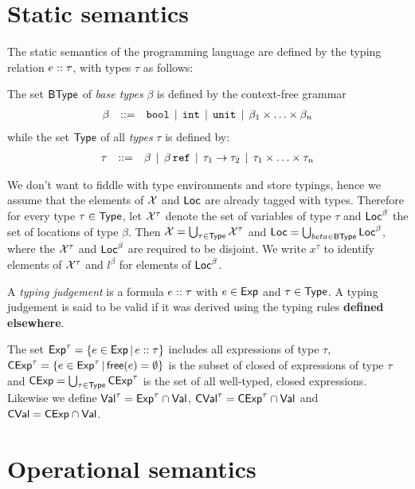 \documentclass[12pt,a4paper]{report}
\newcommand{\CExp}{\sstyle{CExp}}
\newcommand{\CVal}{\sstyle{CVal}}
\newcommand{\BType}{\sstyle{BType}}
\begin{document}

\section{Static semantics}

The static semantics of the programming language are defined by the typing relation
${e}\mathrel{::}{\tau}$, with types $\tau$ as follows:

\begin{definition}[Types]
  The set $\BType$ of {\em base types} $\beta$ is defined by the context-free grammar
  \[\begin{array}{rrlll}
  \beta & ::= & \mathtt{bool} \,\mid\, \mathtt{int} \,\mid\, \mathtt{unit} \,\mid\, \beta_1 \times \ldots \times \beta_n
  \end{array}\]
  while the set $\mathsf{Type}$ of all {\em types} $\tau$ is defined by:
  \[\begin{array}{rrlll}
  \tau & ::= & \beta \,\mid\, \beta\,\mathtt{ref} \,\mid\, \tau_1\to\tau_2 \,\mid\, \tau_1 \times \ldots \times \tau_n
  \end{array}\]
\end{definition}

We don't want to fiddle with type environments and store typings, hence we assume that
the elements of $\mathcal{X}$ and $\mathsf{Loc}$ are already tagged with types. Therefore for every
type $\tau\in\mathsf{Type}$, let $\mathcal{X}^\tau$ denote the set of variables of type $\tau$ and $\mathsf{Loc}^\beta$ the
set of locations of type $\beta$. Then $\mathcal{X}=\bigcup_{\tau\in\mathsf{Type}}\mathcal{X}^\tau$ and
$\Loc=\bigcup_{beta\in\BType}\Loc^\beta$, where the $\mathcal{X}^\tau$ and $\mathsf{Loc}^\beta$ are
required to be disjoint. We write $x^\tau$ to identify elements of $\mathcal{X}^\tau$ and
$l^\beta$ for elements of $\mathsf{Loc}^\beta$.

\begin{definition}
  A {\em typing judgement} is a formula ${e}\mathrel{::}{\tau}$ with
  $e\in\mathsf{Exp}$ and $\tau\in\mathsf{Type}$. A typing judgement is said to
  be valid if it was derived using the typing rules {\bf defined
  elsewhere}.
\end{definition}

The set $\mathsf{Exp}^\tau = \{e\in\mathsf{Exp}\,|\,{e}\mathrel{::}{\tau}\}$ includes all expressions of type $\tau$,
$\CExp^\tau = \{e\in\Exp^\tau\,|\,\free{e}=\emptyset\}$ is the subset of closed of expressions of
type $\tau$ and $\CExp = \bigcup_{\tau\in\Type} \CExp^\tau$ is the set of all well-typed, closed
expressions. Likewise we define $\mathsf{Val}^\tau = \mathsf{Exp}^\tau\cap\mathsf{Val}$, $\CVal^\tau = \CExp^\tau \cap \Val$
and $\CVal = \CExp \cap \Val$.



\section{Operational semantics}
\end{document}
